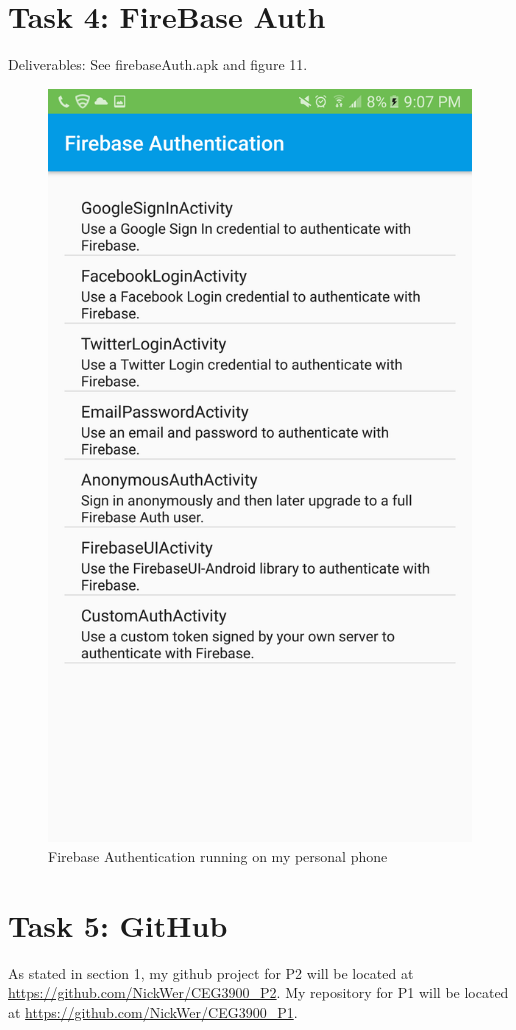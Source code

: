 \documentclass[10pt]{article}
\begin{document}
\section{Task 4: FireBase Auth}
Deliverables: See firebaseAuth.apk and figure 11.
\begin{figure}
\includegraphics[width=\linewidth]{img/firebaseAuth.png}
\caption{Firebase Authentication running on my personal phone}
\end{figure}

\section{Task 5: GitHub}
As stated in section 1, my github project for P2 will be located at \url{https://github.com/NickWer/CEG3900_P2}. My repository for P1 will be located at \url{https://github.com/NickWer/CEG3900_P1}.
\end{document}
